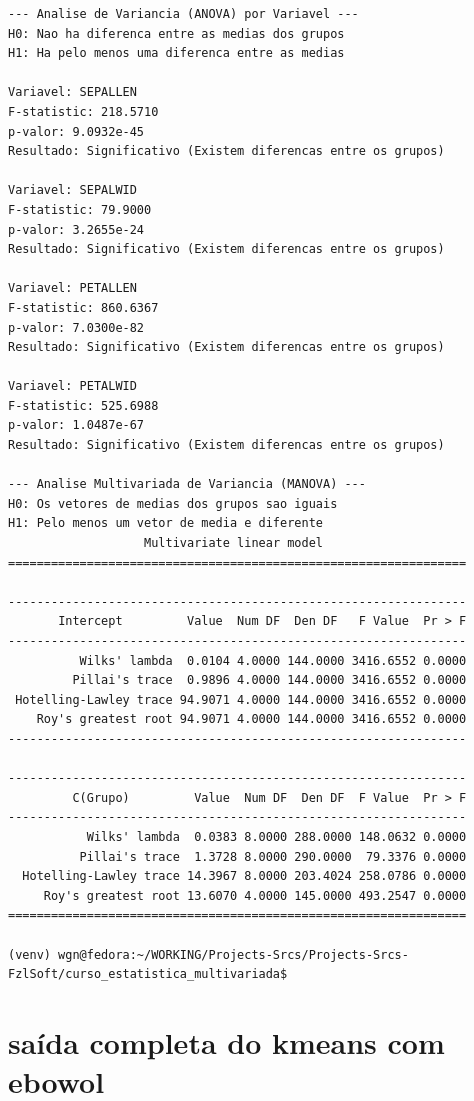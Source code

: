 \documentclass[11pt]{article}
\begin{document}
\begin{verbatim}
--- Analise de Variancia (ANOVA) por Variavel ---
H0: Nao ha diferenca entre as medias dos grupos
H1: Ha pelo menos uma diferenca entre as medias

Variavel: SEPALLEN
F-statistic: 218.5710
p-valor: 9.0932e-45
Resultado: Significativo (Existem diferencas entre os grupos)

Variavel: SEPALWID
F-statistic: 79.9000
p-valor: 3.2655e-24
Resultado: Significativo (Existem diferencas entre os grupos)

Variavel: PETALLEN
F-statistic: 860.6367
p-valor: 7.0300e-82
Resultado: Significativo (Existem diferencas entre os grupos)

Variavel: PETALWID
F-statistic: 525.6988
p-valor: 1.0487e-67
Resultado: Significativo (Existem diferencas entre os grupos)

--- Analise Multivariada de Variancia (MANOVA) ---
H0: Os vetores de medias dos grupos sao iguais
H1: Pelo menos um vetor de media e diferente
                   Multivariate linear model
================================================================
                                                                
----------------------------------------------------------------
       Intercept         Value  Num DF  Den DF   F Value  Pr > F
----------------------------------------------------------------
          Wilks' lambda  0.0104 4.0000 144.0000 3416.6552 0.0000
         Pillai's trace  0.9896 4.0000 144.0000 3416.6552 0.0000
 Hotelling-Lawley trace 94.9071 4.0000 144.0000 3416.6552 0.0000
    Roy's greatest root 94.9071 4.0000 144.0000 3416.6552 0.0000
----------------------------------------------------------------
                                                                
----------------------------------------------------------------
         C(Grupo)         Value  Num DF  Den DF  F Value  Pr > F
----------------------------------------------------------------
           Wilks' lambda  0.0383 8.0000 288.0000 148.0632 0.0000
          Pillai's trace  1.3728 8.0000 290.0000  79.3376 0.0000
  Hotelling-Lawley trace 14.3967 8.0000 203.4024 258.0786 0.0000
     Roy's greatest root 13.6070 4.0000 145.0000 493.2547 0.0000
================================================================

(venv) wgn@fedora:~/WORKING/Projects-Srcs/Projects-Srcs-FzlSoft/curso_estatistica_multivariada$ 

\end{verbatim}
\section{saída completa do kmeans com ebowol}
\label{sec:org12e43fb}
\end{document}
